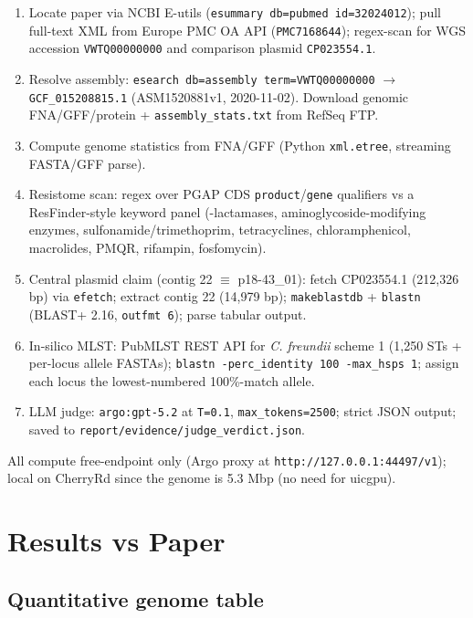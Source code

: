 \documentclass[11pt]{article}
\begin{document}
\begin{enumerate}
\item Locate paper via NCBI E-utils (\texttt{esummary db=pubmed id=32024012}); pull full-text XML
      from Europe PMC OA API (\texttt{PMC7168644}); regex-scan for WGS accession \texttt{VWTQ00000000}
      and comparison plasmid \texttt{CP023554.1}.
\item Resolve assembly: \texttt{esearch db=assembly term=VWTQ00000000} $\rightarrow$
      \texttt{GCF\_015208815.1} (ASM1520881v1, 2020-11-02). Download genomic FNA/GFF/protein
      + \texttt{assembly\_stats.txt} from RefSeq FTP.
\item Compute genome statistics from FNA/GFF (Python \texttt{xml.etree}, streaming FASTA/GFF parse).
\item Resistome scan: regex over PGAP CDS \texttt{product}/\texttt{gene} qualifiers vs a
      ResFinder-style keyword panel (\textbeta-lactamases, aminoglycoside-modifying enzymes,
      sulfonamide/trimethoprim, tetracyclines, chloramphenicol, macrolides, PMQR, rifampin,
      fosfomycin).
\item Central plasmid claim (contig 22 $\equiv$ p18-43\_01): fetch CP023554.1 (212{,}326 bp) via
      \texttt{efetch}; extract contig 22 (14{,}979 bp); \texttt{makeblastdb} + \texttt{blastn}
      (BLAST+ 2.16, \texttt{outfmt 6}); parse tabular output.
\item In-silico MLST: PubMLST REST API for \emph{C. freundii} scheme 1 (1{,}250 STs + per-locus
      allele FASTAs); \texttt{blastn -perc\_identity 100 -max\_hsps 1}; assign each locus the
      lowest-numbered 100\%-match allele.
\item LLM judge: \texttt{argo:gpt-5.2} at \texttt{T=0.1}, \texttt{max\_tokens=2500}; strict JSON output;
      saved to \texttt{report/evidence/judge\_verdict.json}.
\end{enumerate}

All compute free-endpoint only (Argo proxy at \texttt{http://127.0.0.1:44497/v1}); local on
CherryRd since the genome is 5.3 Mbp (no need for uicgpu).

\section{Results vs Paper}

\subsection{Quantitative genome table}
\end{document}
